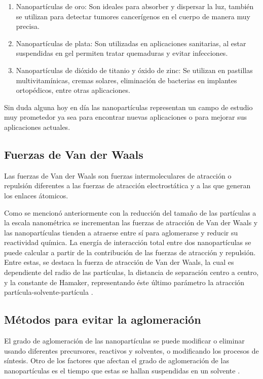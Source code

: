 \documentclass[3p,times,twocolumn]{elsarticle}
\begin{document}
\begin{enumerate}
    \item Nanopartículas de oro: Son ideales para absorber y dispersar la luz, también se utilizan para detectar tumores cancerígenos en el cuerpo de manera muy precisa.
    \item Nanopartículas de plata: Son utilizadas en aplicaciones sanitarias, al estar suspendidas en gel permiten tratar quemaduras y evitar infecciones.
    \item Nanopartículas de dióxido de titanio y óxido de zinc: Se utilizan en pastillas multivitamínicas, cremas solares, eliminación de bacterias en implantes ortopédicos, entre otras aplicaciones.
\end{enumerate}

Sin duda alguna hoy en día las nanopartículas representan un campo de estudio muy prometedor ya sea para encontrar nuevas aplicaciones o para mejorar sus aplicaciones actuales. 

\subsection{Fuerzas de Van der Waals}
Las fuerzas de Van der Waals son fuerzas intermoleculares de atracción o repulsión diferentes a las fuerzas de atracción electrostática y a las que generan los enlaces átomicos.

Como se mencionó anteriormente con la reducción del tamaño de las partículas a la escala nanométrica se incrementan las fuerzas de atracción de Van der Waals y las nanopartículas tienden a atraerse entre sí para aglomerarse y reducir su reactividad química. La energía de interacción total entre dos nanopartículas se puede calcular a partir de la contribución de las fuerzas de atracción y repulsión. Entre estas, se destaca la fuerza de atracción de Van der Waals, la cual es dependiente del radio de las partículas, la distancia de separación centro a centro, y la constante de Hamaker, representando éste último parámetro la atracción partícula-solvente-partícula \cite{3}.


\subsection{Métodos para evitar la aglomeración}
El grado de aglomeración de las nanopartículas se puede modificar o eliminar usando diferentes precursores, reactivos y solventes, o modificando los procesos de síntesis. Otro de los factores que afectan el grado de aglomeración de las nanopartículas es el tiempo que estas se hallan suspendidas en un solvente \cite{4}.
\end{document}
